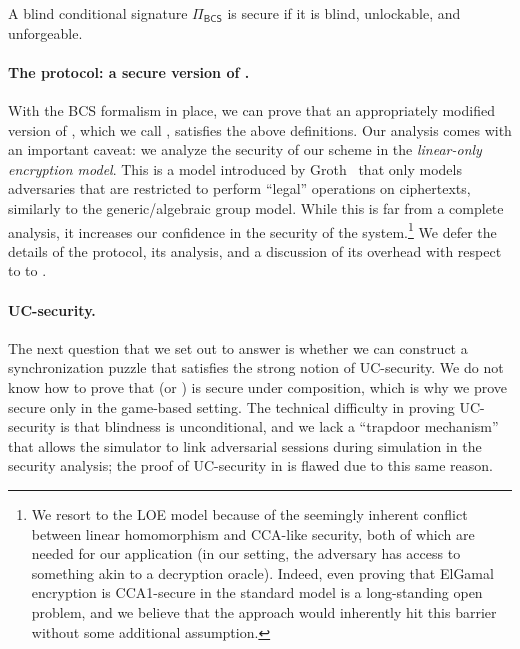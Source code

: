 \begin{definition}[Security]
    A blind conditional signature $\Pi_\mathsf{BCS}$ is secure if it is blind, unlockable, and unforgeable. %
\end{definition}    

\paragraph{The \AALplus protocol: a secure version of \AAL.}
With the BCS formalism in place, we can prove that an appropriately modified version of \AAL, which we call \AALplus, satisfies the above definitions. Our analysis comes with an important caveat: we analyze the security of our scheme in the \emph{linear-only encryption model}. This is a model introduced by Groth~\cite{TCC:Groth04} that only models adversaries that are restricted to perform ``legal'' operations on ciphertexts, similarly to the generic/algebraic group model. While this is far from a complete analysis, it increases our confidence in the security of the system.\footnote{We resort to the LOE model because of the seemingly inherent conflict between linear homomorphism and CCA-like security, both of which are needed for our application (in our setting, the adversary has access to something akin to a decryption oracle). Indeed, even proving that ElGamal encryption is CCA1-secure in the standard model is a long-standing open problem, and we believe that the \AAL approach would inherently hit this barrier without some additional assumption.} We defer the details of the \AALplus protocol, its analysis, and a discussion of its overhead with respect to \AAL to \cite{CCS:GMMMTT22}.

% 

\paragraph{UC-security.} The next question that we set out to answer is whether we can construct a synchronization puzzle that satisfies the strong notion of UC-security. We do not know how to prove that \AAL (or \AALplus) is secure under composition, which is why we prove \AALplus secure only in the game-based setting. The technical difficulty in proving UC-security is that blindness is unconditional, and we lack a ``trapdoor mechanism'' that allows the simulator to link adversarial sessions during simulation in the security analysis; the proof of UC-security in \cite{SP:TaiMorMaf21} is flawed due to this same reason. 

